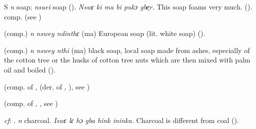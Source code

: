 \begin{letter}{S}
 \textit{n} soap; \textit{nsuei} soap (\citealt{Sumner1921}). \textit{Nswɛ ki ma bi pukɔ gbe̹r.} This soap foams very much. (\citealt{Pichl1967}). comp.  (see ) 

 (comp.) \textit{n} \textit{nswey ndinthɛ} (ma) European soap (lit. white soap) (\citealt{Pichl1967}). 

 (comp.) \textit{n} \textit{nswey nthi} (ma) black soap, local soap made from ashes, especially of the cotton tree or the husks of cotton tree nuts which are then mixed with palm oil and boiled (\citealt{Pichl1967}). 

 (comp. of ,  (der. of , ), see ) 

 (comp. of , , see ) 

 \textit{cf}: . \textit{n} charcoal. \textit{Iswɛ lɛ hɔ gba hink ininka.} Charcoal is different from coal (\citealt{Pichl1967}). 

\end{letter}


